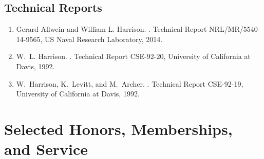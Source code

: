 \documentclass[12pt]{article} %
\begin{document}
\subsection*{Technical Reports}



\begin{enumerate}[leftmargin=0.0mm]

\item
Gerard Allwein and William L. Harrison.
.
\newblock Technical Report NRL/MR/5540-14-9565, US Naval Research Laboratory, 2014. 

\item
W.~L. Harrison.
.
\newblock Technical Report CSE-92-20, University of California at Davis, 1992.


\item
W.~Harrison, K.~Levitt, and M.~Archer.
.
\newblock Technical Report CSE-92-19, University of California at Davis, 1992.

\end{enumerate}


\section*{Selected Honors, Memberships, and Service}
\end{document}

